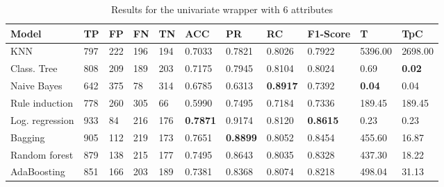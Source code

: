 \documentclass[a4paper,11pt]{article}
\begin{document}
\begin{table}
\centering

\begin{tabular}{|l|l|l|l|l|l|l|l|l|l|l|}
\hline

\textbf{Model} & \textbf{TP} & \textbf{FP} & \textbf{FN} & \textbf{TN} & \textbf{ACC} & \textbf{PR} & \textbf{RC} & \textbf{F1-Score} & \textbf{T} & \textbf{TpC} \\ \hline
KNN & 797 & 222 & 196 & 194 & 0.7033 & 0.7821 & 0.8026 & 0.7922 & 5396.00 & 2698.00 \\ \hline
Class. Tree & 808 & 209 & 189 & 203 & 0.7175 & 0.7945 & 0.8104 & 0.8024 & 0.69 & \textbf{0.02} \\ \hline
Naive Bayes & 642 & 375 & 78 & 314 & 0.6785 & 0.6313 & \textbf{0.8917} & 0.7392 & \textbf{0.04} & 0.04 \\ \hline
Rule induction & 778 & 260 & 305 & 66 & 0.5990 & 0.7495 & 0.7184 & 0.7336 & 189.45 & 189.45 \\ \hline
Log. regression & 933 & 84 & 216 & 176 & \textbf{0.7871} & 0.9174 & 0.8120 & \textbf{0.8615} & 0.23 & 0.23 \\ \hline
Bagging & 905 & 112 & 219 & 173 & 0.7651 & \textbf{0.8899} & 0.8052 & 0.8454 & 455.60 & 16.87 \\ \hline
Random forest & 879 & 138 & 215 & 177 & 0.7495 & 0.8643 & 0.8035 & 0.8328 & 437.30 & 18.22 \\ \hline
AdaBoosting & 851 & 166 & 203 & 189 & 0.7381 & 0.8368 & 0.8074 & 0.8218 & 498.04 & 31.13 \\ \hline

\end{tabular}
\caption{Results for the univariate wrapper with 6 attributes}
\label{class:w25u}
\end{table}
\end{document}
